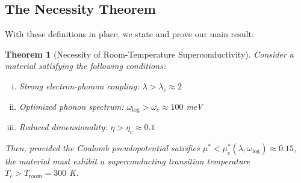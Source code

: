 \documentclass[twocolumn,superscriptaddress]{revtex4-2}
\newtheorem{theorem}{Theorem}
\begin{document}
\subsection{The Necessity Theorem}

With these definitions in place, we state and prove our main result:

\begin{theorem}[Necessity of Room-Temperature Superconductivity]
\label{thm:main}
Consider a material satisfying the following conditions:
\begin{enumerate}[(i)]
\item Strong electron-phonon coupling: $\lambda > \lambda_c \approx 2$
\item Optimized phonon spectrum: $\omega_{\text{log}} > \omega_c \approx 100$ meV
\item Reduced dimensionality: $\eta > \eta_c \approx 0.1$
\end{enumerate}
Then, provided the Coulomb pseudopotential satisfies $\mu^* < \mu^*_c(\lambda, \omega_{\text{log}}) \approx 0.15$, the material must exhibit a superconducting transition temperature $T_c > T_{\text{room}} = 300$ K.
\end{theorem}
\end{document}
